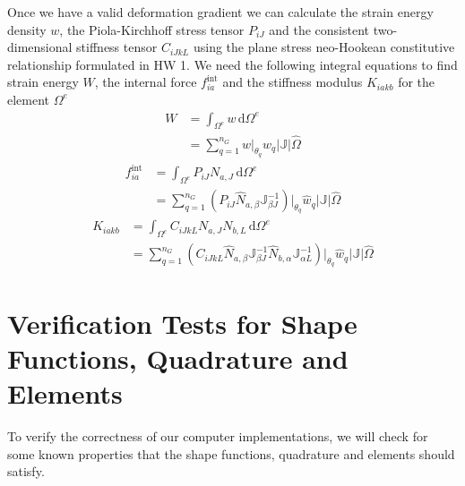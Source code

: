 \documentclass[../main.tex]{subfiles}
\begin{document}
Once we have a valid deformation gradient we can calculate the strain
energy density $w$, the Piola-Kirchhoff stress tensor $P_{iJ}$ and the
consistent two-dimensional stiffness tensor $C_{iJkL}$ using the plane
stress neo-Hookean constitutive relationship formulated in HW 1.  We
need the following integral equations to find strain energy $W$, the
internal force $f^{\text{int}}_{ia}$ and the stiffness modulus
$K_{iakb}$ for the element $\Omega^e$
\begin{align*}
  W &=\int_{\Omega^e}\!w\,\mathrm{d}\Omega^e\\[5pt]
    &=\sum_{q=1}^{n_G}w\bigg\lvert_{\theta_q}\hat{w}_q\lvert\mathbb{J}\lvert\hat{\Omega}
\end{align*}
\begin{align*}
  f_{ia}^{\text{int}} &= \int_{\Omega^e}\!P_{iJ}N_{a,J}\,\mathrm{d}\Omega^e\\[5pt]
                      &=\sum_{q=1}^{n_G}\left(P_{iJ}\hat{N}_{a,\beta}\mathbb{J}^{-1}_{\beta J}\right)\bigg\lvert_{\theta_q}\hat{w}_q\lvert\mathbb{J}\lvert\hat{\Omega}
\end{align*}
\begin{align*}
  K_{iakb} &= \int_{\Omega^e}\!C_{iJkL}N_{a,J}N_{b,L}\,\mathrm{d}\Omega^e\\
           &=\sum_{q=1}^{n_G}\left(C_{iJkL}\hat{N}_{a,\beta}\mathbb{J}^{-1}_{\beta J}\hat{N}_{b,\alpha}\mathbb{J}^{-1}_{\alpha L}\right)\bigg\lvert_{\theta_q}\hat{w}_q\lvert\mathbb{J}\lvert\hat{\Omega}
\end{align*}
\section{Verification Tests for Shape Functions, Quadrature and
  Elements}
To verify the correctness of our computer implementations, we will
check for some known properties that the shape functions, quadrature
and elements should satisfy.
\end{document}
